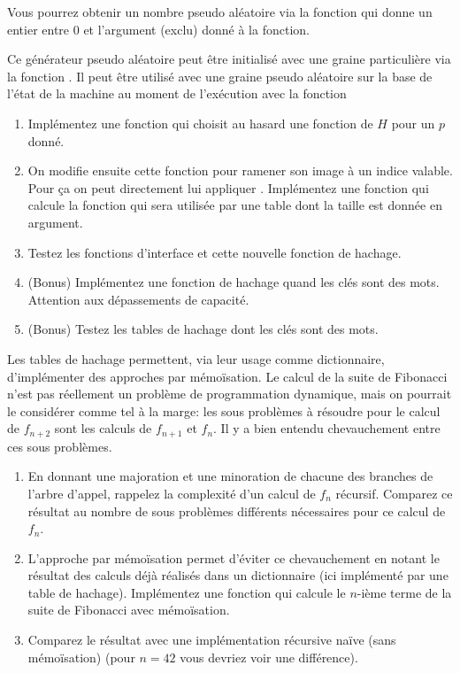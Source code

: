 \documentclass[a4paper, 10pt]{article}
\begin{document}
Vous pourrez obtenir un nombre pseudo aléatoire via la fonction  qui donne un entier entre 0 et l'argument (exclu) donné à la fonction.

Ce générateur pseudo aléatoire peut être initialisé avec une graine particulière via la fonction . Il peut être utilisé avec une graine pseudo aléatoire sur la base de l'état de la machine au moment de l'exécution avec la fonction 
\begin{enumerate}[resume]
\item Implémentez une fonction  qui choisit au hasard une fonction de \(H\) pour un \(p\) donné.
\item On modifie ensuite cette fonction pour ramener son image à un indice valable. Pour ça on peut directement lui appliquer . Implémentez une fonction  qui calcule la fonction qui sera utilisée par une table dont la taille est donnée en argument.
\item Testez les fonctions d'interface et cette nouvelle fonction de hachage.
\item (Bonus) Implémentez une fonction de hachage quand les clés sont des mots. Attention aux dépassements de capacité.
\item (Bonus) Testez les tables de hachage dont les clés sont des mots.
\end{enumerate}
Les tables de hachage permettent, via leur usage comme dictionnaire, d'implémenter des approches par mémoïsation. Le calcul de la suite de Fibonacci n'est pas réellement un problème de programmation dynamique, mais on pourrait le considérer comme tel à la marge: les sous problèmes à résoudre pour le calcul de \(f_{n+2}\) sont les calculs de \(f_{n+1}\) et \(f_n\). Il y a bien entendu chevauchement entre ces sous problèmes.
\begin{enumerate}[resume]
\item En donnant une majoration et une minoration de chacune des branches de l'arbre d'appel, rappelez la complexité d'un calcul de \(f_n\) récursif. Comparez ce résultat au nombre de sous problèmes différents nécessaires pour ce calcul de \(f_n\).
\item L'approche par mémoïsation permet d'éviter ce chevauchement en notant le résultat des calculs déjà réalisés dans un dictionnaire (ici implémenté par une table de hachage). Implémentez une fonction qui calcule le \(n\)-ième terme de la suite de Fibonacci avec mémoïsation.
\item Comparez le résultat avec une implémentation récursive naïve (sans mémoïsation) (pour \(n=42\) vous devriez voir une différence).
\end{enumerate}
\end{document}
